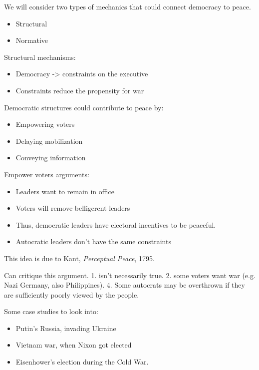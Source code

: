 \documentclass{article}
\begin{document}
We will consider two types of mechanics that could connect democracy to peace.

\begin{itemize}
  \item Structural
  \item Normative
\end{itemize}

Structural mechanisms:

\begin{itemize}
  \item Democracy -> constraints on the executive
  \item Constraints reduce the propensity for war
\end{itemize}

Democratic structures could contribute to peace by:

\begin{itemize}
  \item Empowering voters
  \item Delaying mobilization
  \item Conveying information
\end{itemize}

Empower voters arguments:

\begin{itemize}
  \item Leaders want to remain in office
  \item Voters will remove belligerent leaders
  \item Thus, democratic leaders have electoral incentives to be peaceful.
  \item Autocratic leaders don't have the same constraints
\end{itemize}

This idea is due to Kant, {\it Perceptual Peace}, 1795.

Can critique this argument.  1. isn't necessarily true.  2. some voters want war (e.g. Nazi Germany, also Philippines). 4. Some autocrats may be overthrown if they are sufficiently poorly viewed by the people.

Some case studies to look into:

\begin{itemize}
  \item Putin's Russia, invading Ukraine
  \item Vietnam war, when Nixon got elected
  \item Eisenhower's election during the Cold War.
\end{itemize}
\end{document}
